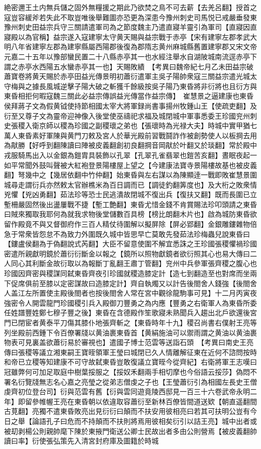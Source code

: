 絶密邇王土内無兵儲之固外無糧援之期此乃欲焚之鳥不可去薪【去羌呂翻】授首之寇豈容緩斧若失此不取豈唯後舉難圖亦恐更為深患今豫州刺史司馬悦已戒嚴垂發東豫州刺史田益宗兵守三關請遣軍司為之節度魏主乃遣直寢羊靈引為軍司【直寢因直寢殿以為官稱】益宗遂入寇建寧太守黄天賜與益宗戰于赤亭【宋有建寧左郡孝武大明八年省建寧左郡為建寧縣屬西陽郡後復為郡隋志黄州麻城縣舊置建寧郡又宋文帝元嘉二十五年以豫部蠻民置二十八縣赤亭其一也水經注舉水自湖陂城南流逕赤亭下謂之赤亭水西陽五水蠻赤亭其一也】天賜敗績　【考異曰魏帝紀七月乙未田益宗破蕭寶卷將黄天賜於赤亭田益光傳景明初蕭衍遣軍主吳子陽帥衆寇三關益宗遣光城太守梅與之據長風城逆擊子陽大破之斬獲千餘級按吳子陽乃東昏將非衍將也且衍方與東昏相拒何暇寇魏三關此必益宗傳誤益光傳當作益宗傳】　崔慧景之逼建康也東昏侯拜蔣子文為假黄钺使持節相國太宰大將軍録尚書事揚州牧鍾山王【使疏吏翻】及衍至又尊子文為靈帝迎神像入後堂使巫禱祀求福及城閉城中軍事悉委王珍國兖州刺史張稷入衛京師以稷為珍國之副稷瓌之弟也【張瓌時為光禄大夫】時城中實甲猶七萬人東昏素好軍陳與黄門刀敕及宮人於華光殿前習戰鬪詐作被創勢使人以板掆去用為猒勝【好呼到翻陳讀曰陣被皮義翻創初良翻掆音岡猒於叶翻又於琰翻】常於殿中戎服騎馬出入以金銀為鎧胄具裝飾以孔翠【孔翠孔雀翡翠也鎧苦亥翻】晝眠夜起一如平常聞外鼓叫聲被大紅袍登景陽樓屋上望之【今建康法寶寺景陽樓故基也被皮義翻】弩幾中之【幾居依翻中竹仲翻】始東昏與左右謀以為陳顯逹一戰即敗崔慧景圍城尋走謂衍兵亦然敕太官辦樵米為百日調而已【調徒釣翻筭度也】及大桁之敗衆情兇懼【兇凶勇翻】茹法珍等恐士民逃潰故閉城不復出兵【復扶又翻】既而長圍已立塹柵嚴固然後出盪屢戰不捷【塹工艶翻】東昏尤惜金錢不肯賞賜法珍叩頭請之東昏曰賊來獨取我耶何為就我求物後堂儲數百具榜【榜比朗翻木片也】啟為城防東昏欲留作殿竟不與又督御府作三百人精仗待圍解以擬屏除【屏必郢翻】金銀雕鏤雜物倍急于常衆皆怨怠不為致力外圍既久城中皆思早亡莫敢先發茹法珍梅蟲兒說東昏曰【鏤盧侯翻為于偽翻說式芮翻】大臣不留意使圍不解宜悉誅之王珍國張稷懼禍珍國密遣所親獻明鏡於蕭衍衍斷金以報之【鏡所以照物獻鏡者欲衍照其心也易大傳曰二人同心其利斷金故衍取以為報斷丁亂翻王肅丁管翻】兖州中兵參軍張齊稷之腹心也珍國因齊密與稷謀同弑東昏齊夜引珍國就稷造膝定計【造七到翻造至也對席而坐兩下促席俱前至膝以定密謀故曰造膝定計】齊自執燭又以計告後閤舍人錢強【後閤舍人盖江左所置使主殿後閤者也按後閤舍人常在宮中觀徐龍駒事可見】十二月丙寅夜強密令人開雲龍門珍國稷引兵入殿御刀豐勇之為内應【豐勇之右衛軍人為東昏所委任姓譜豐姓鄭七穆子豐之後】東昏在含德殿作笙歌寢未熟聞兵入趨出北戶欲還後宮門已閉宦者黄泰平刀傷其膝仆地張齊斬之【東昏時年十九】稷召尚書右僕射王亮等列坐殿前西鍾下令百僚署牋以黄油裹東昏首【黄絹施油可以禦雨謂之黄油以黄油裹物表可見裏盖欲蕭衍易於審視也】遣國子博士范雲等送詣石頭　【考異曰南史王亮傳曰張稷等議立湘東嗣王寶晊領軍王瑩曰城閉已久人情離解征東在近何不諮問按時和帝已立稷等知建康不可守故弑東昏豈敢復議立寶晊今從齊紀】右衛將軍王志嘆曰冠雖弊何可加足取庭中樹葉挼服之【挼奴禾翻兩手相切摩也今俗語云挼莎】偽悶不署名衍覽牋無志名心嘉之亮瑩之從弟志僧虔之子也【王瑩蕭衍引為相國左長史王僧虔齊初位登台司】衍與范雲有舊【衍與雲同遊竟陵西邸見一百三十六卷武帝永明二年】即留參帷幄王亮在東昏朝以依違取容蕭衍至新林百僚皆間道送欵【朝直遥翻間古莧翻】亮獨不遣東昏敗亮出見衍衍曰顛而不扶安用彼相亮曰若其可扶明公豈有今日之舉【論語孔子曰危而不持顛而不扶則將焉用彼相矣衍引以詰王亮】城中出者或被刧剥楊公則親帥麾下陳於東掖門衛送公卿士民故出者多由公則營焉【被皮義翻帥讀曰率】衍使張弘策先入清宮封府庫及圖籍於時城